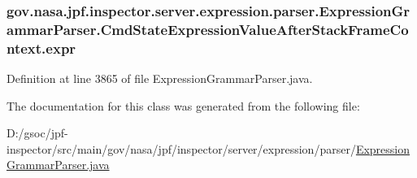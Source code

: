 \subsubsection[{\texorpdfstring{expr}{expr}}]{ gov.\+nasa.\+jpf.\+inspector.\+server.\+expression.\+parser.\+Expression\+Grammar\+Parser.\+Cmd\+State\+Expression\+Value\+After\+Stack\+Frame\+Context.\+expr}\hypertarget{classgov_1_1nasa_1_1jpf_1_1inspector_1_1server_1_1expression_1_1parser_1_1_expression_grammar_pa89116a9ed8dad2a185081bb1175595f7_a9011833cf1fc87fae5ac93c789a870ec}{}\label{classgov_1_1nasa_1_1jpf_1_1inspector_1_1server_1_1expression_1_1parser_1_1_expression_grammar_pa89116a9ed8dad2a185081bb1175595f7_a9011833cf1fc87fae5ac93c789a870ec}


Definition at line 3865 of file Expression\+Grammar\+Parser.\+java.



The documentation for this class was generated from the following file\+:\begin{DoxyCompactItemize}
\item 
D\+:/gsoc/jpf-\/inspector/src/main/gov/nasa/jpf/inspector/server/expression/parser/\hyperlink{_expression_grammar_parser_8java}{Expression\+Grammar\+Parser.\+java}\end{DoxyCompactItemize}
